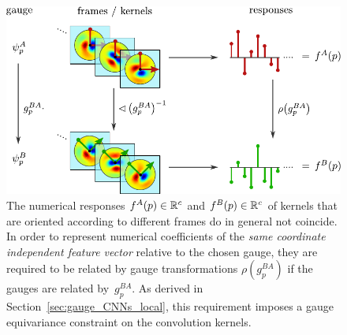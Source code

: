 \begin{figure}
    \centering
    \includegraphics[width=.75\columnwidth]{figures/kernel_responses.pdf}
    \vspace*{1ex}
    \caption{\small
        The numerical responses $f^A(p) \in\mathbb{R}^c$ and $f^B(p) \in\mathbb{R}^c$ of kernels that are oriented according to different frames do in general not coincide.
        In order to represent numerical coefficients of the \emph{same coordinate independent feature vector} relative to the chosen gauge, they are required to be related by gauge transformations $\rho(g_p^{BA})$ if the gauges are related by~$g_p^{BA}$.
        As derived in Section~\ref{sec:gauge_CNNs_local}, this requirement imposes a gauge equivariance constraint on the convolution kernels.
        }
    \label{fig:gauge_trafos_feature_vector}
\end{figure}


